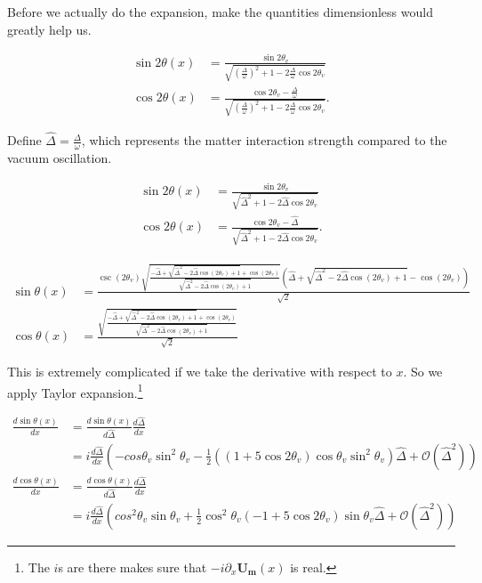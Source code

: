 \documentclass{tufte-handout}
\begin{document}
Before we actually do the expansion, make the quantities dimensionless would greatly help us.

\begin{align*}
\sin 2\theta(x)  &= \frac{\sin 2\theta_v}{\sqrt{ \left(\frac{\Delta}{\omega} \right)^2+1 - 2 \frac{\Delta}{\omega}\cos 2\theta_v }} \\
\cos 2\theta(x)&= \frac{ \cos 2\theta_v - \frac{\Delta}{\omega} }{ \sqrt{ \left( \frac{\Delta}{\omega} \right)^2  +1 - 2 \frac{\Delta}{\omega}\cos 2\theta_v  }}.
\end{align*}

Define $\hat\Delta = \frac{\Delta}{\omega}$, which represents the matter interaction strength compared to the vacuum oscillation.

\begin{align*}
\sin 2\theta(x)  &= \frac{\sin 2\theta_v}{\sqrt{ \hat\Delta ^2+1 - 2 \hat\Delta \cos 2\theta_v }} \\
\cos 2\theta(x)&= \frac{ \cos 2\theta_v - \hat\Delta  }{ \sqrt{\hat\Delta ^2  +1 - 2 \hat\Delta \cos 2\theta_v } }.
\end{align*}



\begin{align*}
\sin\theta(x) & = \frac{\csc \left(2 \theta _v\right) \sqrt{\frac{-\hat{\Delta }+\sqrt{\hat{\Delta }^2-2 \hat{\Delta } \cos \left(2 \theta _v\right)+1}+\cos \left(2 \theta _v\right)}{\sqrt{\hat{\Delta }^2-2 \hat{\Delta } \cos \left(2 \theta _v\right)+1}}} \left(\hat{\Delta }+\sqrt{\hat{\Delta }^2-2 \hat{\Delta } \cos \left(2 \theta _v\right)+1}-\cos \left(2 \theta _v\right)\right)}{\sqrt{2}} \\
\cos\theta(x)& = \frac{\sqrt{\frac{-\hat{\Delta }+\sqrt{\hat{\Delta }^2-2 \hat{\Delta } \cos \left(2 \theta _v\right)+1}+\cos \left(2 \theta _v\right)}{\sqrt{\hat{\Delta }^2-2 \hat{\Delta } \cos \left(2 \theta _v\right)+1}}}}{\sqrt{2}}
\end{align*}


This is extremely complicated if we take the derivative with respect to $x$. So we apply Taylor expansion.\footnote{The $i$s are there makes sure that $-i\partial_x \mathbf{U_m}(x)$ is real.}

\begin{align*}
\frac{d \sin \theta(x)}{dx} &= \frac{d\sin \theta(x)}{d\hat\Delta}\frac{d\hat\Delta}{dx} \\
& = i \frac{d\hat\Delta}{dx} \left(  -cos\theta_v\sin^2\theta_v -\frac{1}{2} ( (1+5\cos 2\theta_v) \cos\theta_v \sin^2\theta_v ) \hat\Delta + \mathcal{O}(\hat\Delta^2) \right) \\
\frac{d\cos\theta(x)}{dx} & = \frac{d\cos\theta(x)}{d\hat\Delta}\frac{d\hat\Delta}{dx} \\
& = i \frac{d\hat\Delta}{dx}\left( cos^2\theta_v\sin\theta_v + \frac{1}{2}\cos^2\theta_v(-1+5\cos 2\theta_v) \sin\theta_v \hat\Delta + \mathcal{O}(\hat\Delta^2) \right)
\end{align*}
\end{document}
